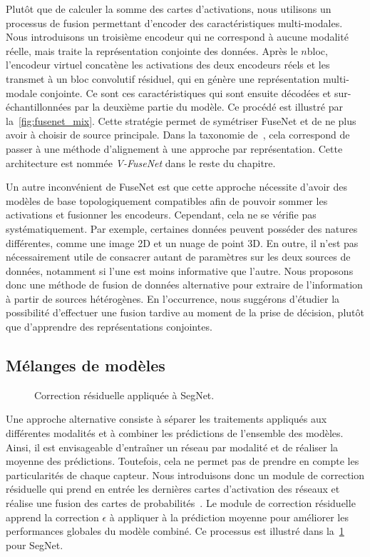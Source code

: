 Plutôt que de calculer la somme des cartes d'activations, nous utilisons un processus de fusion permettant d'encoder des caractéristiques multi-modales. Nous introduisons un troisième encodeur qui ne correspond à aucune modalité réelle, mais traite la représentation conjointe des données. Après le $n$\ieme bloc, l'encodeur virtuel concatène les activations des deux encodeurs réels et les transmet à un bloc convolutif résiduel, qui en génère une représentation multi-modale conjointe. Ce sont ces caractéristiques qui sont ensuite décodées et sur-échantillonnées par la deuxième partie du modèle. Ce procédé est illustré par la~\cref{fig:fusenet_mix}. Cette stratégie permet de symétriser FuseNet et de ne plus avoir à choisir de source principale. Dans la taxonomie de~\citet{baltrusaitis_multimodal_2017}, cela correspond de passer à une méthode d'alignement à une approche par représentation. Cette architecture est nommée \emph{V-FuseNet} dans le reste du chapitre.

Un autre inconvénient de FuseNet est que cette approche nécessite d'avoir des modèles de base topologiquement compatibles afin de pouvoir sommer les activations et fusionner les encodeurs. Cependant, cela ne se vérifie pas systématiquement. Par exemple, certaines données peuvent posséder des natures différentes, comme une image 2D et un nuage de point 3D. En outre, il n'est pas nécessairement utile de consacrer autant de paramètres sur les deux sources de données, notamment si l'une est moins informative que l'autre. Nous proposons donc une méthode de fusion de données alternative pour extraire de l'information à partir de sources hétérogènes. En l'occurrence, nous suggérons d'étudier la possibilité d'effectuer une fusion tardive au moment de la prise de décision, plutôt que d'apprendre des représentations conjointes.

\subsection{Mélanges de modèles}

\begin{figure}[h]
    \resizebox{\textwidth}{!}{}
    \caption{Correction résiduelle appliquée à SegNet.}
    \label{fig:residual_correction}
\end{figure}

Une approche alternative consiste à séparer les traitements appliqués aux différentes modalités et à combiner les prédictions de l'ensemble des modèles. Ainsi, il est envisageable d'entraîner un réseau par modalité et de réaliser la moyenne des prédictions. Toutefois, cela ne permet pas de prendre en compte les particularités de chaque capteur. Nous introduisons donc un module de correction résiduelle qui prend en entrée les dernières cartes d'activation des réseaux et réalise une fusion des cartes de probabilités~\cite{audebert_semantic_2016}. Le module de correction résiduelle apprend la correction $\epsilon$ à appliquer à la prédiction moyenne pour améliorer les performances globales du modèle combiné. Ce processus est illustré dans la~\cref{fig:residual_correction} pour SegNet.

